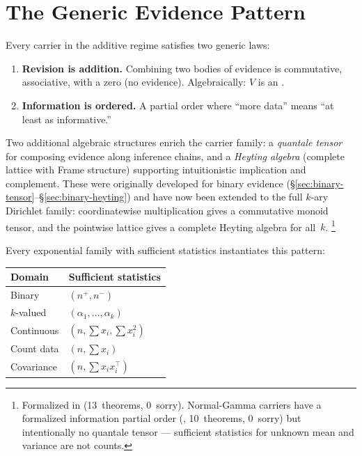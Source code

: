 \documentclass[11pt,openany]{report}
\begin{document}
\section{The Generic Evidence Pattern}

Every carrier in the additive regime satisfies two generic laws:

\begin{enumerate}
\item \textbf{Revision is addition.}  Combining two bodies of evidence
  is commutative, associative, with a zero (no evidence).
  Algebraically: $V$ is an .
\item \textbf{Information is ordered.}  A partial order where ``more
  data'' means ``at least as informative.''
\end{enumerate}

\noindent
Two additional algebraic structures enrich the carrier family:
a \emph{quantale tensor} for composing evidence along inference
chains, and a \emph{Heyting algebra} (complete lattice with Frame
structure) supporting intuitionistic implication and complement.
These were originally developed for binary evidence
(\S\ref{sec:binary-tensor}--\S\ref{sec:binary-heyting}) and have
now been extended to the full $k$-ary Dirichlet family:
coordinatewise multiplication gives a commutative monoid tensor,
and the pointwise lattice gives a complete Heyting algebra for
all~$k$.%
\footnote{Formalized in
(13~theorems, 0~sorry).  Normal-Gamma carriers have a
formalized information partial order
(,
10~theorems, 0~sorry) but intentionally no quantale tensor ---
sufficient statistics for unknown mean and variance are not
counts.}

Every exponential family with sufficient statistics instantiates this
pattern:

\begin{center}
\begin{tabular}{ll}
\toprule
\textbf{Domain} & \textbf{Sufficient statistics} \\
\midrule
Binary       & $(n^+, n^-)$ \\
$k$-valued   & $(\alpha_1, \ldots, \alpha_k)$ \\
Continuous   & $(n, \sum x_i, \sum x_i^2)$ \\
Count data   & $(n, \sum x_i)$ \\
Covariance   & $(n, \sum x_i x_i^\top)$ \\
\bottomrule
\end{tabular}
\end{center}
\end{document}
